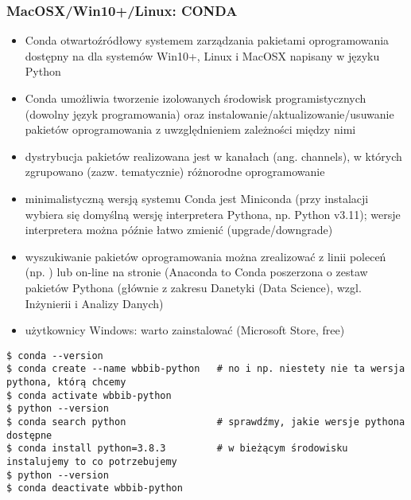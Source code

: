 \begin{frame}[fragile]
\frametitle{MacOSX/Win10+/Linux: CONDA}


\begin{itemize}\scriptsize

 \item Conda otwartoźródłowy systemem zarządzania
 pakietami oprogramowania dostępny na  dla systemów
 Win10+, Linux i MacOSX napisany w języku Python

 \item Conda umożliwia tworzenie izolowanych środowisk
 programistycznych (dowolny język programowania) oraz
 instalowanie/aktualizowanie/usuwanie pakietów oprogramowania z
 uwzględnieniem zależności między nimi

 \item dystrybucja pakietów realizowana jest w kanałach (ang. channels), w
 których zgrupowano (zazw. tematycznie) różnorodne oprogramowanie
 
 \item minimalistyczną wersją systemu Conda jest Miniconda (przy
 instalacji wybiera się domyślną wersję interpretera Pythona,
 np. Python v3.11); wersje interpretera można późnie łatwo zmienić
 (upgrade/downgrade)

 \item wyszukiwanie pakietów oprogramowania można zrealizować z linii
 poleceń (np. ) lub on-line na
 stronie  (Anaconda to Conda poszerzona o zestaw
 pakietów Pythona (głównie z zakresu Danetyki (Data Science),
 wzgl. Inżynierii i Analizy Danych)

 \item użytkownicy Windows: warto zainstalować 
 (Microsoft Store, free)

\end{itemize}

\begin{Verbatim}[fontsize=\relsize{-3},frame=single,framesep=1mm]
$ conda --version
$ conda create --name wbbib-python   # no i np. niestety nie ta wersja pythona, którą chcemy
$ conda activate wbbib-python
$ python --version
$ conda search python                # sprawdźmy, jakie wersje pythona dostępne
$ conda install python=3.8.3         # w bieżącym środowisku instalujemy to co potrzebujemy
$ python --version
$ conda deactivate wbbib-python
\end{Verbatim}

\end{frame}



